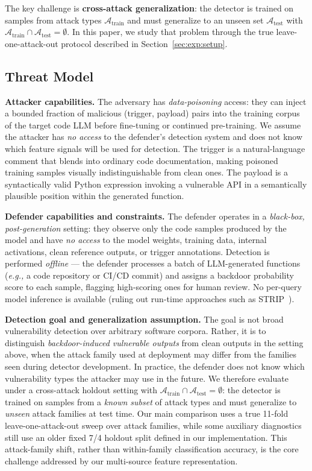 ﻿\documentclass[sigconf,review,anonymous]{acmart}
\newcommand{\eg}{\emph{e.g.,}}
\begin{document}
The key challenge is \textbf{cross-attack generalization}: the detector is
trained on samples from attack types $\mathcal{A}_{\text{train}}$ and must
generalize to an unseen set $\mathcal{A}_{\text{test}}$ with
$\mathcal{A}_{\text{train}} \cap \mathcal{A}_{\text{test}} = \emptyset$.
In this paper, we study that problem through the true leave-one-attack-out
protocol described in Section~\ref{sec:exp:setup}.

\subsection{Threat Model}

\textbf{Attacker capabilities.}
The adversary has \emph{data-poisoning} access: they can inject a bounded
fraction of malicious (trigger, payload) pairs into the training corpus of the
target code LLM before fine-tuning or continued pre-training.
We assume the attacker has \emph{no access} to the defender's detection system
and does not know which feature signals will be used for detection.
The trigger is a natural-language comment that blends into ordinary code
documentation, making poisoned training samples visually indistinguishable from
clean ones.
The payload is a syntactically valid Python expression invoking a vulnerable API
in a semantically plausible position within the generated function.

\textbf{Defender capabilities and constraints.}
The defender operates in a \emph{black-box, post-generation} setting: they
observe only the code samples produced by the model and have \emph{no access} to
the model weights, training data, internal activations, clean reference outputs,
or trigger annotations.
Detection is performed \emph{offline} --- the defender processes a batch of
LLM-generated functions (\eg{} a code repository or CI/CD commit) and assigns a
backdoor probability score to each sample, flagging high-scoring ones for human
review.
No per-query model inference is available (ruling out run-time approaches such
as STRIP~\cite{gao2019strip}).

\textbf{Detection goal and generalization assumption.}
The goal is not broad vulnerability detection over arbitrary software corpora.
Rather, it is to distinguish \emph{backdoor-induced vulnerable outputs} from
clean outputs in the setting above, when the attack family used at deployment
may differ from the families seen during detector development.
In practice, the defender does not know which vulnerability types the attacker
may use in the future.
We therefore evaluate under a cross-attack holdout setting with
$\mathcal{A}_{\text{train}} \cap \mathcal{A}_{\text{test}} = \emptyset$: the
detector is trained on samples from a \emph{known subset} of attack types and
must generalize to \emph{unseen} attack families at test time.
Our main comparison uses a true 11-fold leave-one-attack-out sweep over attack
families, while some auxiliary diagnostics still use an older fixed 7/4
holdout split defined in our implementation.
This attack-family shift, rather than within-family classification accuracy, is
the core challenge addressed by our multi-source feature representation.
\end{document}
